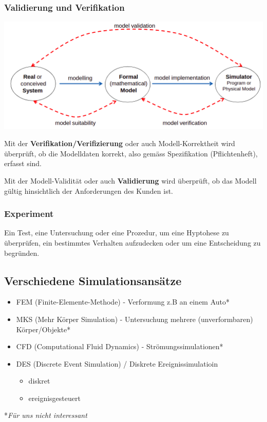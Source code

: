 \subsubsection{Validierung und Verifikation}
\begin{minipage}[t]{1\textwidth}
    \centering
	\includegraphics[width=0.9\linewidth]{images/simulationsphasen.png}
\end{minipage}

Mit der \textbf{Verifikation/Verifizierung} oder auch Modell-Korrektheit wird überprüft, ob die Modelldaten korrekt, also gemäss Spezifikation (Pflichtenheft), erfasst sind.

Mit der Modell-Validität oder auch \textbf{Validierung} wird überprüft, ob das Modell gültig hinsichtlich der Anforderungen des Kunden ist.



\subsubsection{Experiment}
Ein Test, eine Untersuchung oder eine Prozedur, um eine Hyptohese zu überprüfen, ein bestimmtes Verhalten aufzudecken oder um eine Entscheidung zu begründen.

\subsection{Verschiedene Simulationsansätze}
\begin{itemize}
    \item FEM (Finite-Elemente-Methode) - Verformung z.B an einem Auto*
    \item MKS (Mehr Körper Simulation) - Untersuchung mehrere (unverformbaren) Körper/Objekte*
    \item CFD (Computational Fluid Dynamics) - Strömungssimulationen*
    \item DES (Discrete Event Simulation) / Diskrete Ereignissimulatioin 
    \begin{itemize}
        \item diskret
        \item ereignisgesteuert
    \end{itemize}
\end{itemize}
*\textit{Für uns nicht interessant}

